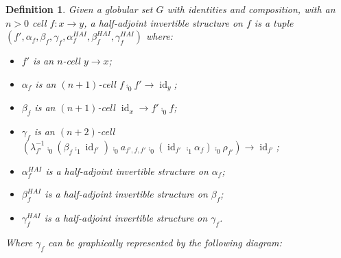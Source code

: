 \documentclass[draft]{article}
\newtheorem{definition}[theorem]{Definition} \theoremstyle{remark}
\DeclareMathOperator{\id}{id}
\begin{document}
\begin{definition}
  Given a globular set \(G\) with identities and composition, with an
  \(n > 0\) cell \(f : x \to y\), a \emph{half-adjoint invertible}
  structure on \(f\) is a
  tuple \((f', \alpha_f, \beta_f, \gamma_f, \alpha_f^{HAI},
  \beta_f^{HAI}, \gamma_f^{HAI})\) where:
  \begin{itemize}
  \item \(f'\) is an \(n\)-cell \(y \to x\);
  \item \(\alpha_f\) is an \((n+1)\)-cell \(f \comp_0 f' \to \id_y\);
  \item \(\beta_f\) is an \((n+1)\)-cell \(\id_x \to f' \comp_0 f\);
  \item \(\gamma_f\) is an \((n+2)\)-cell \((\lambda_{f'}^{-1} \comp_0
    (\beta_f \comp_1 \id_{f'}) \comp_0 a_{f',f,f'} \comp_0 (\id_{f'}
    \comp_1 \alpha_f) \comp_0 \rho_{f'}) \to \id_{f'}\);
  \item \(\alpha_f^{HAI}\) is a half-adjoint invertible structure on
    \(\alpha_f\);
  \item \(\beta_f^{HAI}\) is a half-adjoint invertible structure on
    \(\beta_f\);
  \item \(\gamma_f^{HAI}\) is a half-adjoint invertible structure on
    \(\gamma_f\).
  \end{itemize}

  Where \(\gamma_f\) can be graphically represented by the following
  diagram:
  \begin{center}
  \end{center}
\end{definition}
\end{document}
